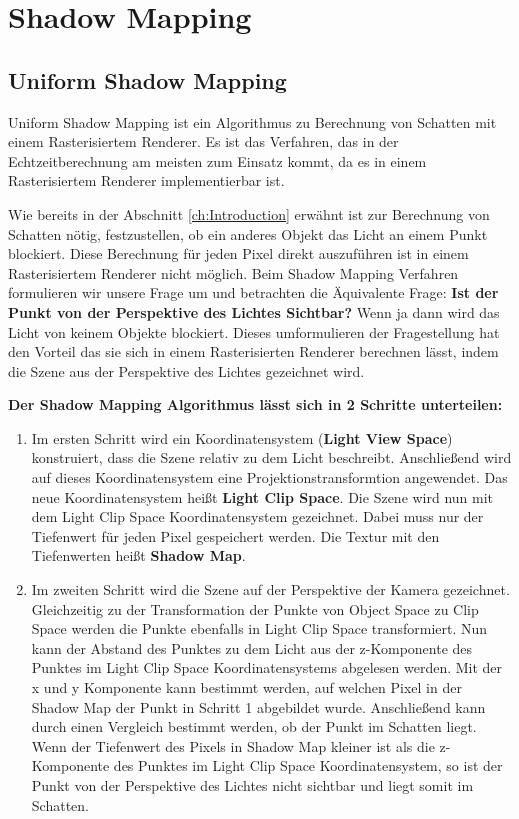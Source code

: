 \chapter{Shadow Mapping} %
\label{section:shadow-mapping}
\section{Uniform Shadow Mapping}
\label{section:uniform-shadow-mapping}
Uniform Shadow Mapping \cite{Williams1978} ist ein Algorithmus zu Berechnung von Schatten 
mit einem Rasterisiertem Renderer. 
Es ist das Verfahren, das in der Echtzeitberechnung am meisten zum Einsatz kommt, 
da es in einem Rasterisiertem Renderer implementierbar ist.
\par
Wie bereits in der Abschnitt \ref{ch:Introduction} erwähnt ist zur Berechnung von Schatten nötig, festzustellen,
ob ein anderes Objekt das Licht an einem Punkt blockiert.
Diese Berechnung für jeden Pixel direkt auszuführen ist in einem Rasterisiertem 
Renderer nicht möglich.
Beim Shadow Mapping Verfahren formulieren wir unsere Frage um und betrachten 
die Äquivalente Frage:
\textbf{Ist der Punkt von der Perspektive des Lichtes Sichtbar?}
Wenn ja dann wird das Licht von keinem Objekte blockiert.
Dieses umformulieren der Fragestellung hat den Vorteil das sie sich in
einem Rasterisierten Renderer berechnen lässt, indem die Szene aus der Perspektive des Lichtes gezeichnet wird.
\par
\textbf{Der Shadow Mapping Algorithmus lässt sich in 2 Schritte 
unterteilen:}
\begin{enumerate}
  \item Im ersten Schritt wird ein Koordinatensystem (\textbf{Light View Space}) konstruiert, 
    dass die Szene relativ zu dem Licht beschreibt.
    Anschließend wird auf dieses Koordinatensystem eine Projektionstransformtion angewendet.
    Das neue Koordinatensystem heißt \textbf{Light Clip Space}.
    Die Szene wird nun mit dem Light Clip Space Koordinatensystem gezeichnet.
    Dabei muss nur der Tiefenwert für jeden Pixel gespeichert werden.
    Die Textur mit den Tiefenwerten heißt \textbf{Shadow Map}.
  \item Im zweiten Schritt wird die Szene auf der Perspektive der Kamera gezeichnet.
    Gleichzeitig zu der Transformation der Punkte von Object Space zu Clip Space
    werden die Punkte ebenfalls in Light Clip Space transformiert.
    Nun kann der Abstand des Punktes zu dem Licht 
    aus der z-Komponente des Punktes im Light Clip Space Koordinatensystems abgelesen werden.
    Mit der x und y Komponente kann bestimmt werden, auf welchen Pixel in der Shadow Map der Punkt in Schritt 1 abgebildet wurde.
    Anschließend kann durch einen Vergleich bestimmt werden, ob der Punkt im Schatten liegt.
    Wenn der Tiefenwert des Pixels in Shadow Map kleiner ist als die z-Komponente des Punktes im Light Clip Space Koordinatensystem,
    so ist der Punkt von der Perspektive des Lichtes nicht sichtbar und liegt somit im Schatten.
\end{enumerate}
